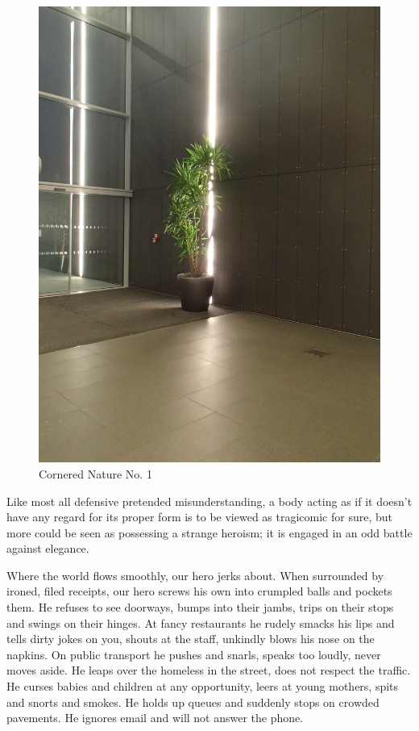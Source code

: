 \documentclass{book}
\begin{document}
\begin{figure}
\centering
\includegraphics[width=\textwidth,angle=-90]{figures/P1050156.JPG}
\caption{Cornered Nature No. 1}
\end{figure}

Like most all defensive pretended misunderstanding, a body acting as if it
doesn't have any regard for its proper form is to be viewed as tragicomic for
sure, but more could be seen as possessing a strange heroism; it is engaged in
an odd battle against elegance.

Where the world flows smoothly, our hero jerks about. When surrounded by
ironed, filed receipts, our hero screws his own into crumpled balls and pockets
them. He refuses to see doorways, bumps into their jambs, trips on their stops
and swings on their hinges. At fancy restaurants he rudely smacks his lips and
tells dirty jokes on you, shouts at the staff, unkindly blows his nose on the
napkins.  On public transport he pushes and snarls, speaks too loudly, never
moves aside.  He leaps over the homeless in the street, does not respect the
traffic. He curses babies and children at any opportunity, leers at young
mothers, spits and snorts and smokes. He holds up queues and suddenly stops on
crowded pavements. He ignores email and will not answer the phone.
\end{document}
